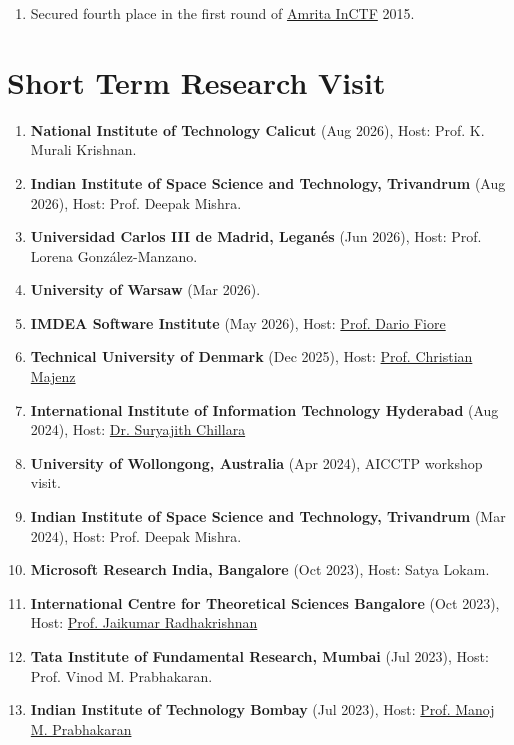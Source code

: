 \documentclass[margin]{res} %
\begin{document}
\begin{resume}
\begin{enumerate}
    \item Secured fourth place in the first round of \href{https://inctf.in}{Amrita InCTF} 2015.
\end{enumerate}



\section{Short Term Research Visit}

\begin{enumerate}
    \item \textbf{National Institute of Technology Calicut} (Aug 2026), Host: Prof. K. Murali Krishnan.
    \item \textbf{Indian Institute of Space Science and Technology, Trivandrum} (Aug 2026), Host: Prof. Deepak Mishra.
    \item \textbf{Universidad Carlos III de Madrid, Leganés} (Jun 2026), Host: Prof. Lorena González-Manzano.
    \item \textbf{University of Warsaw} (Mar 2026).
    \item \textbf{IMDEA Software Institute} (May 2026), Host: \href{https://www.dariofiore.it}{Prof. Dario Fiore}
    
    \item \textbf{Technical University of Denmark} (Dec 2025), Host: \href{https://www.christianmajenz.info/about-me.html}{Prof. Christian Majenz}
    
    \item \textbf{International Institute of Information Technology Hyderabad} (Aug 2024), Host: \href{https://suryajith.github.io}{Dr. Suryajith Chillara}

    \item \textbf{University of Wollongong, Australia} (Apr 2024), AICCTP workshop visit.
    \item \textbf{Indian Institute of Space Science and Technology, Trivandrum} (Mar 2024), Host: Prof. Deepak Mishra.
    \item \textbf{Microsoft Research India, Bangalore} (Oct 2023), Host: Satya Lokam.
    \item \textbf{International Centre for Theoretical Sciences Bangalore} (Oct 2023), Host: \href{https://en.wikipedia.org/wiki/Jaikumar_Radhakrishnan}{Prof. Jaikumar Radhakrishnan}

    \item \textbf{Tata Institute of Fundamental Research, Mumbai} (Jul 2023), Host: Prof. Vinod M. Prabhakaran.
    \item \textbf{Indian Institute of Technology Bombay} (Jul 2023), Host: \href{https://www.cse.iitb.ac.in/~mp/}{Prof. Manoj M. Prabhakaran}


\end{enumerate}
\end{resume}
\end{document}
